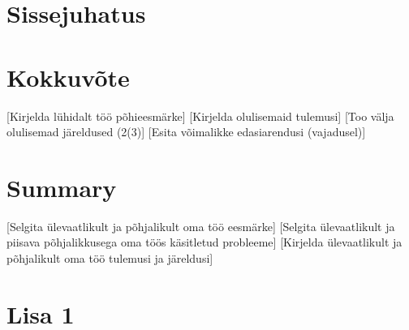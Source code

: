 \documentclass[a4paper, titlepage, 12pt]{article}
\begin{document}


\begin{abstract}
[Here you should briefly describe the aims of your work]
[Here you should briefly describe the main problems dealt with]
[Here you should briefly describe the main results obtained]

The thesis is in [language] and contains [pages] pages of text, [chapters]
chapters, [figures] figures, [tables] tables., etc.
\end{abstract}

\listoffigures
\newpage

\listoftables
\tableofcontents
\newpage

\section*{Sissejuhatus}





\section*{Kokkuvõte}
[Kirjelda lühidalt töö põhieesmärke]
[Kirjelda olulisemaid tulemusi]
[Too välja olulisemad järeldused (2(3)]
[Esita võimalikke edasiarendusi (vajadusel)]

\section*{Summary}
[Selgita ülevaatlikult ja põhjalikult oma töö eesmärke] 
[Selgita ülevaatlikult ja piisava põhjalikkusega oma töös käsitletud probleeme]
[Kirjelda ülevaatlikult ja põhjalikult oma töö tulemusi ja järeldusi]




\section*{Lisa 1}
\end{document}
